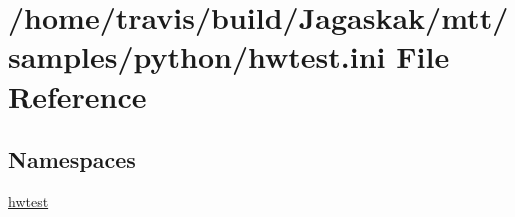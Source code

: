\hypertarget{hwtest_8ini}{\section{/home/travis/build/\-Jagaskak/mtt/samples/python/hwtest.ini File Reference}
\label{hwtest_8ini}
}
\subsection*{Namespaces}
\begin{DoxyCompactItemize}
\item 
\hyperlink{namespacehwtest}{hwtest}
\end{DoxyCompactItemize}
